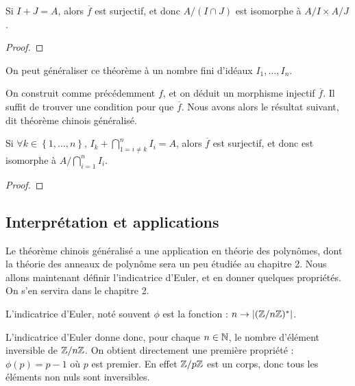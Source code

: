 \begin{theorem}
	Si $I + J = A$, alors $\overline{f}$ est surjectif, et donc $A/(I \cap
	J)$ est isomorphe à $A/I \times A/J$.
\end{theorem}

\begin{proof}
	
\end{proof}

On peut généraliser ce théorème à un nombre fini d'idéaux $I_{1}, \ldots,
I_{n}$.

On construit comme précédemment $f$, et on déduit un morphisme injectif
$\overline{f}$. Il suffit de trouver une condition pour que $\overline{f}$. Nous
avons alors le résultat suivant, dit théorème chinois généralisé.

\begin{theorem}
	Si $\forall k \in \left\{1, \ldots, n\right\}$, $I_{k} + \displaystyle
	\bigcap_{1 = i \ne k}^{n} I_{i} = A$, alors $\overline{f}$ est surjectif, et
	donc  est isomorphe à $\displaystyle A/\bigcap_{i = 1}^{n}
	I_{i}$.
\end{theorem}

\begin{proof}
	
\end{proof}

\subsection{Interprétation et applications}

Le théorème chinois généralisé a une application en théorie des polynômes, dont
la théorie des anneaux de polynôme sera un peu étudiée au chapitre 2.
Nous allons maintenant définir l'indicatrice d'Euler, et en donner quelques
propriétés.
On s'en servira dans le chapitre 2.

\begin{definition}
	L'indicatrice d'Euler, noté souvent $\phi$ est la fonction
	\GSfunction{$\phi$}{$\naturel$}{$\naturel$} : $n \rightarrow
	|(\mathbb{Z}/n\mathbb{Z})^{*}|$.
\end{definition}

L'indicatrice d'Euler donne donc, pour chaque $n \in \mathbb{N}$, le nombre
d'élément inversible de $\mathbb{Z}/n\mathbb{Z}$.
On obtient directement une première propriété : $\phi(p) = p - 1$ où $p$ est
premier. En effet $\mathbb{Z}/p\mathbb{Z}$ est un corps, donc tous les éléments non
nuls sont inversibles.

